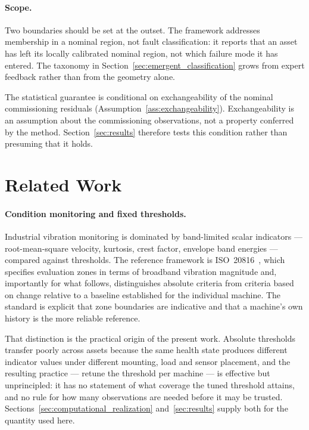 \documentclass[a4paper]{cas-sc}
\begin{document}
\paragraph{Scope.}
Two boundaries should be set at the outset. The framework addresses membership
in a nominal region, not fault classification: it reports that an asset has
left its locally calibrated nominal region, not which failure mode it has
entered. The taxonomy in Section~\ref{sec:emergent_classification} grows from
expert feedback rather than from the geometry alone.

The statistical guarantee is conditional on exchangeability of the nominal
commissioning residuals (Assumption~\ref{ass:exchangeability}). Exchangeability
is an assumption about the commissioning observations, not a property conferred
by the method. Section~\ref{sec:results} therefore tests this condition rather
than presuming that it holds.

\section{Related Work}
\label{sec:related}


\paragraph{Condition monitoring and fixed thresholds.}
Industrial vibration monitoring is dominated by band-limited scalar
indicators --- root-mean-square velocity, kurtosis, crest factor, envelope
band energies --- compared against thresholds. The reference framework is
\mbox{ISO~20816}~\citep{iso20816}, which specifies evaluation zones in terms of broadband
vibration magnitude and, importantly for what follows, distinguishes absolute
criteria from criteria based on change relative to a baseline established for
the individual machine. The standard is explicit that zone boundaries are
indicative and that a machine's own history is the more reliable reference.

That distinction is the practical origin of the present work. Absolute
thresholds transfer poorly across assets because the same health state
produces different indicator values under different mounting, load and sensor
placement, and the resulting practice --- retune the threshold per machine ---
is effective but unprincipled: it has no statement of what coverage the tuned
threshold attains, and no rule for how many observations are needed before it
may be trusted. Sections~\ref{sec:computational_realization}
and~\ref{sec:results} supply both for the quantity used here.
\end{document}
